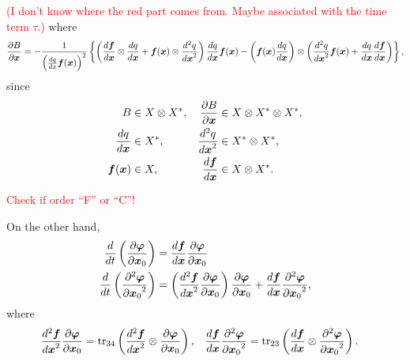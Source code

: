 \documentclass[a4paper]{article}
\newcommand{\deriv}[3][1]{%
    \ifthenelse{\equal{#1}{1}}{\frac{d #2}{d #3}}{\frac{d^#1 #2}{{d #3}^#1}}
}
\newcommand{\pderiv}[3][1]{%
    \ifthenelse{\equal{#1}{1}}{\frac{\partial #2}{\partial #3}}{\frac{\partial^#1 #2}{{\partial #3}^#1}}
}
\newcommand{\parens}[1]{\left(#1\right)}
\newcommand{\tr}{\mathop{\mathrm{tr}}\nolimits}
\newcommand{\braces}[1]{\left\{#1\right\}}
\newcommand{\traj}{\bm \varphi}
\newcommand{\red}[1]{\textcolor{red}{#1}}
\begin{document}
\red{(I don't know where the red part comes from. Maybe associated with the time term $\tau$.)}
where
\begin{align}
    \pderiv{B}{\bm x}
    =
    - \frac{1}{
        \parens{\deriv{q}{x} \bm f(\bm x)}^2
    }
    \braces{
        \parens{
            \deriv{\bm f}{\bm x} \otimes \deriv{q}{\bm x}
            +
            \bm f(\bm x) \otimes \deriv[2]{q}{\bm x}
        }
        \deriv{q}{\bm x} \bm f(\bm x)
        -
        \parens{\bm f(\bm x) \deriv{q}{\bm x}} \otimes
        \parens{
            \deriv[2]{q}{\bm x} \bm f(\bm x)
            +
            \deriv{q}{\bm x} \deriv{\bm f}{\bm x}
        }
    },
\end{align}
since
\begin{align}
    \begin{aligned}
        B &\in X \otimes X^* ,&
        \pderiv{B}{\bm x} &\in X \otimes X^* \otimes X^*,\\
        \deriv{q}{\bm x}&\in X^*, &
        \deriv[2]{q}{\bm x} & \in X^* \otimes X^*,\\
        \bm f(\bm x) &\in X, &
        \deriv{\bm f}{\bm x} &\in X \otimes X^*.
    \end{aligned}
\end{align}

\red{Check if order ``F'' or ``C''!}

On the other hand,
\begin{align}
    \deriv{}{t}
    \parens{\pderiv{\traj}{\bm x_0}}
    &= \deriv{\bm f}{\bm x} \pderiv{\traj}{\bm x_0}\\
    \deriv{}{t}
    \parens{\pderiv[2]{\traj}{\bm x_0}}
    &=
    \parens{\deriv[2]{\bm f}{\bm x} \pderiv{\traj}{\bm x_0}}
    \pderiv{\traj}{\bm x_0}
    +
    \deriv{\bm f}{\bm x} \pderiv[2]{\traj}{\bm x_0},
\end{align}
where
\begin{align}
    \begin{aligned}
        \deriv[2]{\bm f}{\bm x} \pderiv{\traj}{\bm x_0}
        &= \tr_{34} \parens{
            \deriv[2]{\bm f}{\bm x} \otimes \pderiv{\traj}{\bm x_0}
        },
        &
        \deriv{\bm f}{\bm x} \pderiv[2]{\traj}{\bm x_0}
        &=
        \tr_{23} \parens{
            \deriv{\bm f}{\bm x} \otimes \pderiv[2]{\traj}{\bm x_0}
        }.
    \end{aligned}
\end{align}
\end{document}
